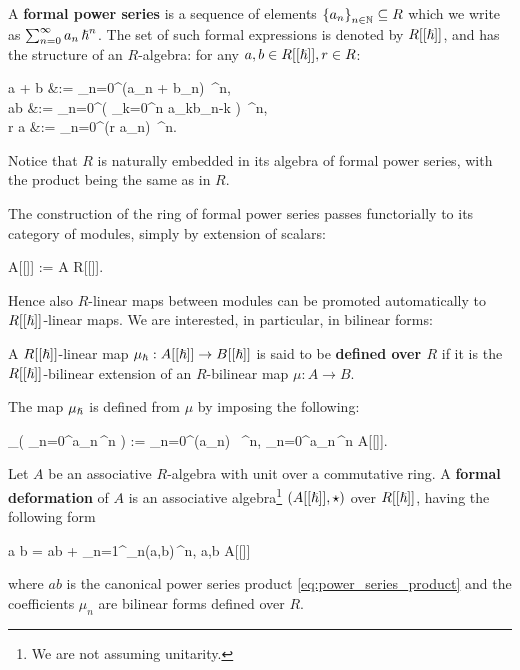 \documentclass[main.tex]{subfiles}
\begin{document}
\begin{definition}
	A \textbf{formal power series} is a sequence of elements $\left\{a_{n}\right\}_{n \in \mathbb{N}} \subseteq R$ which we write as $\sum_{n=0}^\infty a_n\, {\boldsymbol\hslash}^n$. The set of such formal expressions is denoted by $R[[{\boldsymbol\hslash}]]$, and has the structure of an $R$-algebra: for any $a,b \in R[[{\boldsymbol\hslash}]], r \in R$:
	\begin{eqalign}
		a + b &:= \sum_{n=0}^\infty (a_n + b_n)\, \planck^n,\\
		\label{eq:power_series_product}
		ab &:= \sum_{n=0}^\infty \left( \sum_{k=0}^n a_kb_{n-k} \right) \,\planck^n,\\
		r \cdot a &:= \sum_{n=0}^\infty (r \cdot a_n) \,\planck^n.
	\end{eqalign}
\end{definition}

Notice that $R$ is naturally embedded in its algebra of formal power series, with the product being the same as in $R$.

The construction of the ring of formal power series passes functorially to its category of modules, simply by extension of scalars:
\begin{eqalign}
	A[[\planck]] := A \tens[R] R[[\planck]].
\end{eqalign}
Hence also $R$-linear maps between modules can be promoted automatically to $R[[{\boldsymbol\hslash}]]$-linear maps. We are interested, in particular, in bilinear forms:

\begin{definition}
	A $R[[{\boldsymbol\hslash}]]$-linear map $\mu_\hbar : A[[{\boldsymbol\hslash}]] \to B[[{\boldsymbol\hslash}]]$ is said to be \textbf{defined over $R$} if it is the $R[[{\boldsymbol\hslash}]]$-bilinear extension of an $R$-bilinear map $\mu : A \to B$.
\end{definition}

The map $\mu_{\boldsymbol\hslash}$ is defined from $\mu$ by imposing the following:
\begin{eqalign}
	\mu_\planck\left( \sum_{n=0}^\infty a_n\,\planck^n \right) := \sum_{n=0}^\infty \mu(a_n) \, \planck^n, \quad \forall \sum_{n=0}^\infty a_n\,\planck^n \in A[[\planck]].
\end{eqalign}

\begin{definition}
	Let $A$ be an associative $R$-algebra with unit over a commutative ring. A \textbf{formal deformation} of $A$ is an associative algebra\footnote{We are not assuming unitarity.} $(A[[{\boldsymbol\hslash}]], \star)$ over $R[[{\boldsymbol\hslash}]]$, having the following form
	\begin{eqalign}
		a \star b = ab + \sum_{n=1}^\infty \mu_n(a,b)\,\planck^n, \quad \forall a,b \in A[[\planck]]
	\end{eqalign}
	where $ab$ is the canonical power series product \eqref{eq:power_series_product} and the coefficients $\mu_n$ are bilinear forms defined over $R$.
\end{definition}
\end{document}
